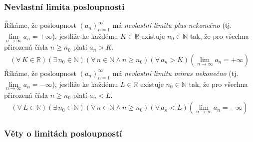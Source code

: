 \documentclass[12pt]{article}
\begin{document}
\subsubsection{Nevlastní limita posloupnosti}
\label{sec:posl_limita_nev}
Říkáme, že posloupnost $(a_n)_{n=1}^{\infty}$ má \emph{nevlastní limitu plus nekonečno} (tj. $\lim\limits_{n \to \infty} a_n = +\infty$), jestliže ke každému $K \in \mathbb{R}$ existuje $n_0 \in \mathbb{N}$ tak, že pro všechna přirozená čísla $n \geq n_0$ platí $a_n > K$.
\begin{align}
( \forall \, K \in \mathbb{R})( \exists \, n_0 \in \mathbb{N})( \forall \, n \in \mathbb{N}\land n \geq n_0)( \forall \, a_n >K) \left(\lim_{n \to \infty} a_n = + \infty\right)
\end{align}
Říkáme, že posloupnost $(a_n)_{n=1}^{\infty}$ má \emph{nevlastní limitu minus nekonečno} (tj. $\lim\limits_{n \to \infty} a_n = -\infty$), jestliže ke každému $L \in \mathbb{R}$ existuje $n_0 \in \mathbb{N}$ tak, že pro všechna přirozená čísla $n \geq n_0$ platí $a_n <L$.
\begin{align}
( \forall \, L \in \mathbb{R})( \exists \, n_0 \in \mathbb{N})(\forall \, n \in \mathbb{N} \land n \geq n_0)( \forall \, a_n <L) \left(\lim_{n \to \infty} a_n = - \infty\right)
\end{align}
\subsubsection{Věty o limitách posloupností}
\end{document}
